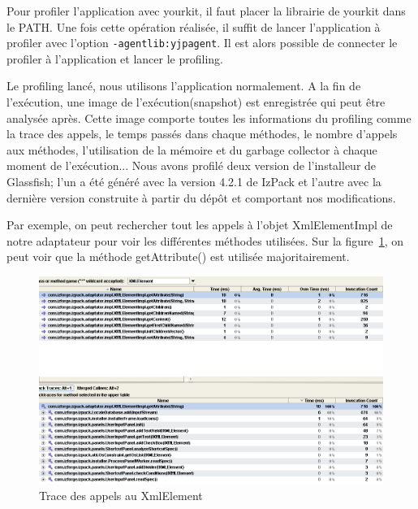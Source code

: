 Pour profiler l'application avec yourkit, il faut placer la librairie de yourkit dans le PATH. 
Une fois cette opération réalisée, il suffit de lancer l'application à profiler avec l'option \verb|-agentlib:yjpagent|.
Il est alors possible de connecter le profiler à l'application et lancer le profiling.

Le profiling lancé, nous utilisons l'application normalement. 
A la fin de l'exécution, une image de l'exécution(snapshot) est enregistrée qui peut être analysée après.
Cette image comporte toutes les informations du profiling comme la trace des appels, le temps passés dans chaque méthodes, le nombre d'appels aux méthodes, l'utilisation de la mémoire et du garbage collector à chaque moment de l'exécution...
Nous avons profilé deux version de l'installeur de Glassfish; l'un a été généré avec la version 4.2.1 de IzPack et l'autre avec la dernière version construite à partir du dépôt et comportant nos modifications.

Par exemple, on peut rechercher tout les appels à l'objet XmlElementImpl de notre adaptateur pour voir les différentes méthodes utilisées. Sur la figure~\ref{fig:yourkitXmlElement}, on peut voir que la méthode getAttribute() est utilisée majoritairement.
\begin{figure}[H]
	\centering
	\includegraphics[width=1\textwidth]{../image/yourkitXmlElement.png}
	\caption{Trace des appels au XmlElement}
	\label{fig:yourkitXmlElement}
\end{figure}


